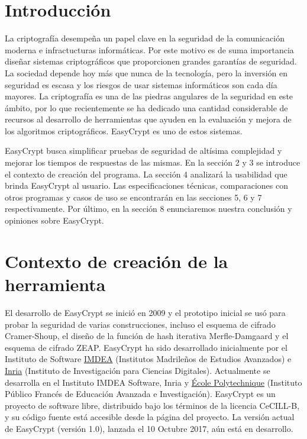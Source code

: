 \documentclass[runningheads,a4paper]{llncs}
\begin{document}
\section{Introducción}
La criptografía desempeña un papel clave en la seguridad de la comunicación moderna e infractucturas informáticas.  Por este motivo es de suma importancia diseñar sistemas criptográficos que proporcionen grandes garantías de seguridad.
La sociedad depende hoy más que nunca de la tecnología, pero la inversión en seguridad es escasa y los riesgos de usar sistemas informáticos son cada día mayores. La criptografía es una de las piedras angulares de la seguridad en este  ámbito, por lo que recientemente se ha dedicado una cantidad considerable de recursos al desarrollo de herramientas que ayuden en la evaluación y mejora de los algoritmos criptográficos. EasyCrypt es uno de estos sistemas.

EasyCrypt busca simplificar pruebas de seguridad de altísima complejidad y mejorar los tiempos de respuestas de las mismas. En la sección 2 y 3 se introduce el contexto de creación del programa. La sección 4 analizará la usabilidad que brinda EasyCrypt al usuario. Las especificaciones técnicas, comparaciones con otros programas y casos de uso se encontrarán en las secciones 5, 6 y 7 respectivamente. Por último, en la sección 8 enunciaremos nuestra conclusión y opiniones sobre EasyCrypt.
    
\section{Contexto de creación de la herramienta}
El desarrollo de EasyCrypt se inició en 2009 y el prototipo inicial se usó para probar la seguridad de varias construcciones, incluso el esquema de cifrado Cramer-Shoup, el diseño de la función de hash iterativa Merfle-Damgaard y el esquema de cifrado ZEAP. EasyCrypt ha sido desarrollado inicialmente por el Instituto de Software \href{http://www.imdea.org/es}{IMDEA} (Institutos Madrileños de Estudios Avanzados) e \href{https://www.inria.fr/en/}{Inria} (Instituto de Investigación para Ciencias Digitales). Actualmente se desarrolla en el Instituto IMDEA Software, Inria y \href{https://www.polytechnique.edu/}{École Polytechnique} (Instituto Público Francés de Educación Avanzada e Investigación). EasyCrypt es un proyecto de software libre, distribuido bajo los términos de la licencia CeCILL-B, y su código fuente está accesible desde la página del proyecto. 
La versión actual de EasyCrypt (versión 1.0), lanzada el 10 Octubre 2017, aún está en desarrollo. 
\cite{article2}
\end{document}
